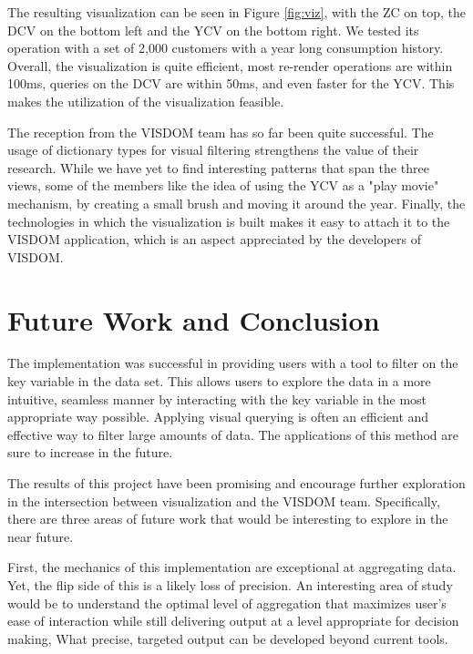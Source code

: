\documentclass[letterpaper, 12 pt, conference]{ieeeconf}  %
\begin{document}






The resulting visualization can be seen in Figure \ref{fig:viz}, with the ZC on top, the DCV on the bottom left and the YCV on the bottom right. We tested its operation with a set of 2,000 customers with a year long consumption history. Overall, the visualization is quite efficient, most re-render operations are within 100ms, queries on the DCV are within 50ms, and even faster for the YCV. This makes the utilization of the visualization feasible. 

The reception from the VISDOM team has so far been quite successful. The usage of dictionary types for visual filtering strengthens the value of their research. While we have yet to find interesting patterns that span the three views, some of the members like the idea of using the YCV as a "play movie" mechanism, by creating a small brush and moving it around the year. Finally, the technologies in which the visualization is built makes it easy to attach it to the VISDOM application, which is an aspect appreciated by the developers of VISDOM.

\section{Future Work and Conclusion}

The implementation was successful in providing users with a tool to filter on the key variable in the data set. This allows users to explore the data in a more intuitive, seamless manner by interacting with the key variable in the most appropriate way possible. Applying visual querying is often an efficient and effective way to filter large amounts of data. The applications of this method are sure to increase in the future.

The results of this project have been promising and  encourage further exploration in the intersection between visualization and the VISDOM team. Specifically, there are three areas of future work that would be interesting to explore in the near future.


First, the mechanics of this implementation are exceptional at aggregating data. Yet, the flip side of this is a likely loss of precision. An interesting area of study would be to understand the optimal level of aggregation that maximizes user’s ease of interaction while still delivering output at a level appropriate for decision making, What precise, targeted output can be developed beyond current tools.
\end{document}
